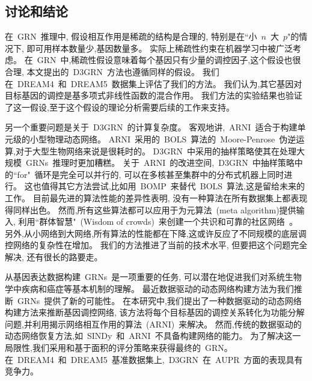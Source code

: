 \subsection{讨论和结论}

在~GRN~推理中, 假设相互作用是稀疏的结构是合理的,
特别是在``小~$n$~大~$p$"的情况下, 即可用样本数量少,基因数量多。
实际上稀疏性约束在机器学习中被广泛考虑。
在~GRN~中,稀疏性假设意味着每个基因只有少量的调控因子,这个假设也很合理,
本文提出的~D3GRN~方法也遵循同样的假设。
我们在~DREAM4~和~DREAM5~数据集上评估了我们的方法。
我们认为,其它基因对目标基因的调控是基多项式非线性函数的混合作用。
我们方法的实验结果也验证了这一假设,至于这个假设的理论分析需要后续的工作来支持。

另一个重要问题是关于~D3GRN~的计算复杂度。
客观地讲,~ARNI~适合于构建单元级的小型物理动态网络。
ARNI~采用的~BOLS~算法的~Moore-Penrose~伪逆运算,对于大型生物网络来说是很耗时的。
D3GRN~中采用的抽样策略使其在处理大规模~GRNs~推理时更加糟糕。
关于~ARNI~的改进空间,~D3GRN~中抽样策略中的``for"~循环是完全可以并行的,
可以在多核甚至集群中的分布式机器上同时进行。
这也值得其它方法尝试,比如用~BOMP~\cite{majumdar2009fast}来替代~BOLS~算法,这是留给未来的工作。
目前最先进的算法性能的差异性表明,
没有一种算法在所有数据集上都表现得同样出色。
然而,所有这些算法都可以应用于为元算法~(meta algorithm)提供输入,
利用``群体智慧"~(Wisdom of crowds)~来创建一个共识和可靠的社区网络~\cite{Marbach2012a,zheng2008gene}。
另外,从小网络到大网络,所有算法的性能都在下降,这或许反应了不同规模的底层调控网络的复杂性在增加。
我们的方法推进了当前的技术水平, 但要把这个问题完全解决, 还有很长的路要走。

从基因表达数据构建~GRNs~是一项重要的任务,
可以潜在地促进我们对系统生物学中疾病和癌症等基本机制的理解。
最近数据驱动的动态网络构建方法为我们推断~GRNs~提供了新的可能性。
在本研究中,我们提出了一种数据驱动的动态网络构建方法来推断基因调控网络,
该方法将每个目标基因的调控关系转化为功能分解问题,并利用揭示网络相互作用的算法~(ARNI)~来解决。
然而,传统的数据驱动的动态网络恢复方法,如~SINDy~和~ARNI~不具备构建网络的能力。
为了解决这一局限性,我们采用和基于面积的评分策略来获得最终的~GRN。
在~DREAM4~和~DREAM5~基准数据集上,~D3GRN~在~AUPR~方面的表现具有竞争力。